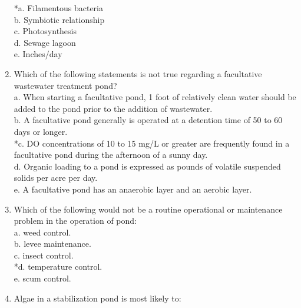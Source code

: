 \begin{enumerate}
*a. Filamentous bacteria \\

b. Symbiotic relationship \\

c. Photosynthesis \\

d. Sewage lagoon \\

e. Inches/day \\


\item  Which of the following statements is not true regarding a facultative wastewater treatment pond? \\


a. When starting a facultative pond, 1 foot of relatively clean water should be added to the pond prior to the addition of wastewater. \\

b. A facultative pond generally is operated at a detention time of 50 to 60 days or longer. \\

*c. DO concentrations of 10 to 15 mg/L or greater are frequently found in a facultative pond during the afternoon of a sunny day. \\

d. Organic loading to a pond is expressed as pounds of volatile suspended solids per acre per day. \\

e. A facultative pond has an anaerobic layer and an aerobic layer. \\


\item  Which of the following would not be a routine operational or maintenance problem in the operation of pond: \\


a. weed control. \\

b. levee maintenance. \\

c. insect control. \\

*d. temperature control. \\

e. scum control. \\


\item  Algae in a stabilization pond is most likely to: \\



\end{enumerate}
